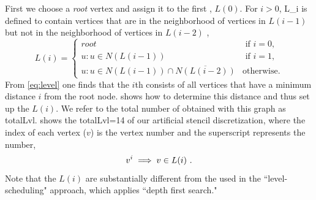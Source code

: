First we choose a \emph{root} vertex and assign it to the
first \level, $L(0)$\@. For $i>0$, \level \acrshort{L_i}
is defined to contain vertices that are in the neighborhood of vertices
in $L(i-1)$ but not in the neighborhood of vertices
in $L(i-2)$ \cite{BFS_level_def}, \ie
\begin{equation}\label{eq:level}
L(i) = 
\begin{cases}
	 root & \text{ if } i = 0, \\
	 u : u \in N(L(i-1))  & \text{ if } i = 1, \\
	 u : u \in N(L(i-1)) \cap \overline{N(L(i-2))}  & \text{otherwise}.
\end{cases}   
\end{equation}
From \cref{eq:level} one finds that the $i$th \level consists of all
vertices that have a minimum distance $i$ from the root node.
 shows how to determine this distance and thus set up the
\levels $L(i)$\@. We refer to the total number of \levels obtained with this graph
as \acrshort{totalLvl}.  shows the
\acrshort{totalLvl}=14 \levels of our artificial stencil
discretization, where the index of each vertex ($v$) is the
vertex number and the superscript represents the \level number, \ie
\begin{equation}\label{eq:node_notation}
	v^i \implies v \in L(i)\eos
\end{equation}
Note that the $L(i)$ are  substantially different from the \levels used in
the ``level-scheduling" \cite{saad} approach, which applies ``depth first
search."

\setlength{\fboxsep}{0pt}%

